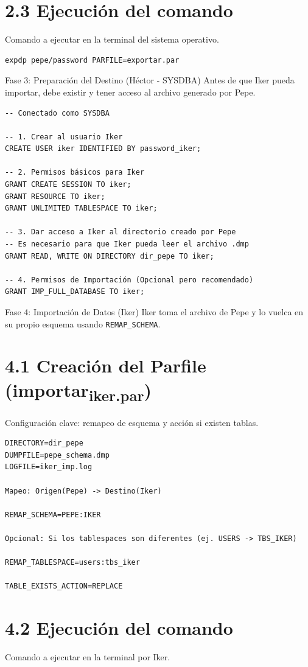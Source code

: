 \documentclass[11pt]{article}
\begin{document}
\section{2.3 Ejecución del comando}
\label{sec:org133d7e3}
Comando a ejecutar en la terminal del sistema operativo.

\begin{verbatim}
expdp pepe/password PARFILE=exportar.par
\end{verbatim}

Fase 3: Preparación del Destino (Héctor - SYSDBA)
Antes de que Iker pueda importar, debe existir y tener acceso al archivo generado por Pepe.

\begin{verbatim}
-- Conectado como SYSDBA

-- 1. Crear al usuario Iker
CREATE USER iker IDENTIFIED BY password_iker;

-- 2. Permisos básicos para Iker
GRANT CREATE SESSION TO iker;
GRANT RESOURCE TO iker;
GRANT UNLIMITED TABLESPACE TO iker;

-- 3. Dar acceso a Iker al directorio creado por Pepe
-- Es necesario para que Iker pueda leer el archivo .dmp
GRANT READ, WRITE ON DIRECTORY dir_pepe TO iker;

-- 4. Permisos de Importación (Opcional pero recomendado)
GRANT IMP_FULL_DATABASE TO iker;
\end{verbatim}

Fase 4: Importación de Datos (Iker)
Iker toma el archivo de Pepe y lo vuelca en su propio esquema usando \texttt{REMAP\_SCHEMA}.
\section{4.1 Creación del Parfile (importar\textsubscript{iker.par})}
\label{sec:org7c68eab}
Configuración clave: remapeo de esquema y acción si existen tablas.

\begin{verbatim}
DIRECTORY=dir_pepe
DUMPFILE=pepe_schema.dmp
LOGFILE=iker_imp.log

Mapeo: Origen(Pepe) -> Destino(Iker)

REMAP_SCHEMA=PEPE:IKER

Opcional: Si los tablespaces son diferentes (ej. USERS -> TBS_IKER)

REMAP_TABLESPACE=users:tbs_iker

TABLE_EXISTS_ACTION=REPLACE
\end{verbatim}
\section{4.2 Ejecución del comando}
\label{sec:org7bfa72d}
Comando a ejecutar en la terminal por Iker.
\end{document}
